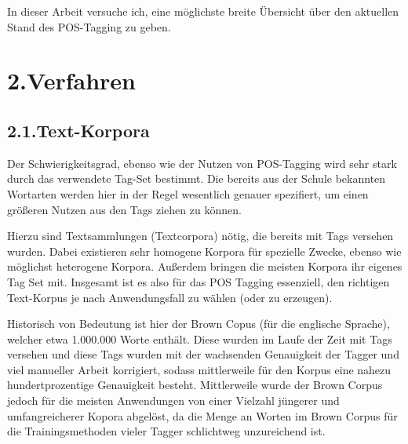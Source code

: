 \documentclass{article}
\begin{document}
\noindent{}In dieser Arbeit versuche ich, eine möglichste breite Übersicht über den aktuellen Stand des POS-Tagging zu geben.%

\section{2.\hspace*{0.5em}Verfahren}\label{sec-verfahren}%

\subsection{2.1.\hspace*{0.5em}Text-Korpora}\label{sec-text-korpora}%

\noindent{}Der Schwierigkeitsgrad, ebenso wie der Nutzen von POS-Tagging wird sehr stark durch das verwendete Tag-Set bestimmt. Die bereits aus der Schule bekannten Wortarten werden hier in der Regel wesentlich genauer spezifiert, um einen größeren Nutzen aus den Tags ziehen zu können.%

Hierzu sind Textsammlungen (Textcorpora) nötig, die bereits mit Tags versehen wurden.
Dabei existieren sehr homogene Korpora für spezielle Zwecke, ebenso wie möglichst heterogene Korpora. Außerdem bringen die meisten Korpora ihr eigenes Tag Set mit. Insgesamt ist es also für das POS Tagging essenziell, den richtigen Text-Korpus je nach Anwendungsfall zu wählen (oder zu erzeugen).%

Historisch von Bedeutung ist hier der Brown Copus (für die englische Sprache), welcher etwa 1.000.000 Worte enthält. Diese wurden im Laufe der Zeit mit Tags versehen und diese Tags wurden mit der wachsenden Genauigkeit der Tagger und viel manueller Arbeit korrigiert, sodass mittlerweile für den Korpus eine nahezu hundertprozentige Genauigkeit besteht.
Mittlerweile wurde der Brown Corpus jedoch für die meisten Anwendungen von einer Vielzahl jüngerer und umfangreicherer Kopora abgelöst, da die Menge an Worten im Brown Corpus für die Trainingsmethoden vieler Tagger schlichtweg unzureichend ist.%
\end{document}

